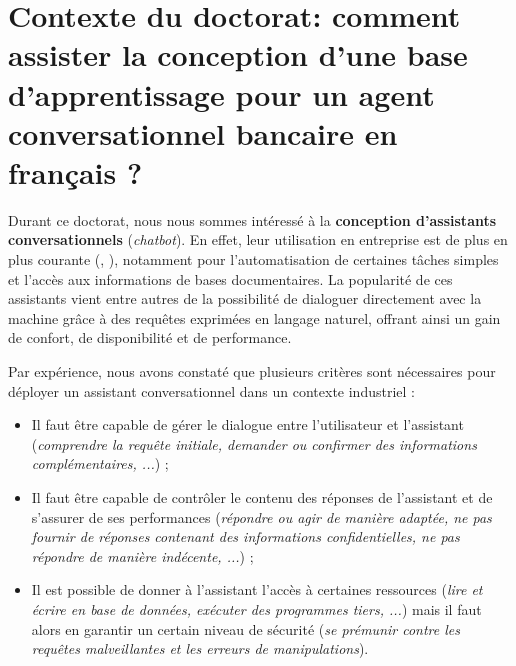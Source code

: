 \section[
	Contexte du doctorat: comment assister la conception d'une base d'apprentissage ?
]{
	Contexte du doctorat: comment assister la conception d'une base d'apprentissage pour un agent conversationnel bancaire en français ?
}
\label{section:2.4-CONTEXTE-DOCTORAT}

	Durant ce doctorat, nous nous sommes intéressé à la \textbf{conception d'assistants conversationnels} (\textit{chatbot}).
	En effet, leur utilisation en entreprise est de plus en plus courante (\cite{goasduff:2019:chatbots-will-appeal}, \cite{costello-lodolce:2022:gartner-predicts-chatbots}), notamment pour l'automatisation de certaines tâches simples et l'accès aux informations de bases documentaires.
	La popularité de ces assistants vient entre autres de la possibilité de dialoguer directement avec la machine grâce à des requêtes exprimées en langage naturel, offrant ainsi un gain de confort, de disponibilité et de performance.
	
	Par expérience, nous avons constaté que plusieurs critères sont nécessaires pour déployer un assistant conversationnel dans un contexte industriel :
	\begin{itemize}
		\item Il faut être capable de gérer le dialogue entre l'utilisateur et l'assistant (\textit{comprendre la requête initiale, demander ou confirmer des informations complémentaires, ...}) ;
		\item Il faut être capable de contrôler le contenu des réponses de l'assistant et de s'assurer de ses performances (\textit{répondre ou agir de manière adaptée, ne pas fournir de réponses contenant des informations confidentielles, ne pas répondre de manière indécente, ...}) ;
		\item Il est possible de donner à l'assistant l'accès à certaines ressources (\textit{lire et écrire en base de données, exécuter des programmes tiers, ...}) mais il faut alors en garantir un certain niveau de sécurité (\textit{se prémunir contre les requêtes malveillantes et les erreurs de manipulations}).
	\end{itemize}
	
